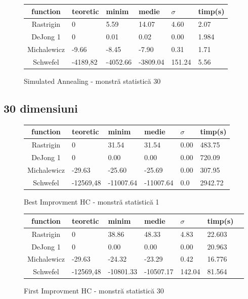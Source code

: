 \documentclass{article}
\begin{document}
\begin{figure}[!h]
\begin{tabular}{||c|||l|l|l|l|l||}
  \hline
  function & teoretic & minim & medie & $\sigma$ & timp(s) \\ \hline \hline
  Rastrigin & 0 & 5.59 & 14.07 & 4.60 & 2.07 \\ \hline
  DeJong 1 & 0 & 0.01 & 0.02 & 0.00 & 1.984\\ \hline
  Michalewicz & -9.66 & -8.45 & -7.90 & 0.31 & 1.71 \\ \hline
  Schwefel & -4189,82 & -4052.66 & -3809.04 & 151.24 & 5.56 \\ \hline
\end{tabular}
\caption{Simulated Annealing - monstră statistică 30}
\end{figure}

\clearpage
\subsection{30 dimensiuni}

\begin{figure}[!h]
\begin{tabular}{||c|||l|l|l|l|l||}
  \hline
  function & teoretic & minim & medie & $\sigma$ & timp(s) \\ \hline \hline
  Rastrigin & 0 & 31.54 & 31.54 & 0.00 & 483.75 \\ \hline
  DeJong 1 & 0 & 0.00 & 0.00 & 0.00 & 720.09\\ \hline
  Michalewicz & -29.63 & -25.60 & -25.69 & 0.00 & 307.95 \\ \hline
  Schwefel & -12569,48 & -11007.64 & -11007.64 & 0.0 & 2942.72 \\ \hline
\end{tabular}
\caption{Best Improvment HC - monstră statistică 1}
\end{figure}

\begin{figure}[!h]
\begin{tabular}{||c|||l|l|l|l|l|l||}
  \hline
  function & teoretic & minim & medie & $\sigma$ & timp(s) \\ \hline \hline
  Rastrigin & 0 & 38.86 & 48.33 & 4.83 & 22.603 \\ \hline
  DeJong 1 & 0 & 0.00 & 0.00 & 0.00 & 20.963\\ \hline
  Michalewicz & -29.63 & -24.32 & -23.29 & 0.42 & 16.776 \\ \hline
  Schwefel & -12569,48 & -10801.33 & -10507.17 & 142.04 & 81.564 \\ \hline
\end{tabular}
\caption{First Improvment HC - monstră statistică 30}
\end{figure}
\end{document}
